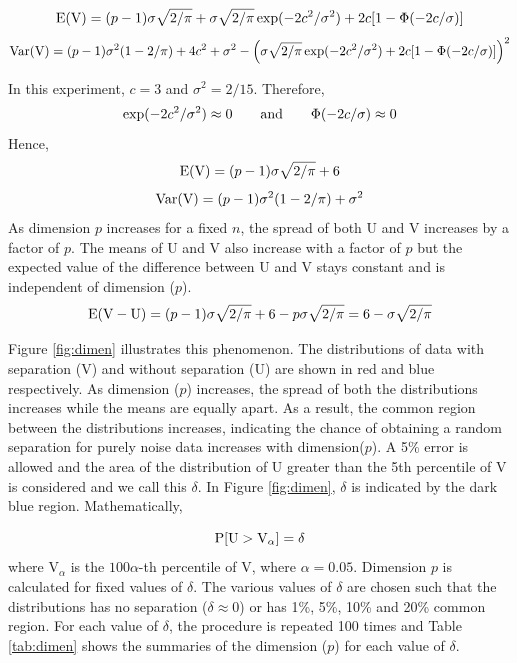 $$\hbox{E}(\mbox{V}) = (p - 1) \sigma \sqrt{2/\pi} + \sigma \sqrt{2/\pi} \exp(- 2c^2/\sigma^2) + 2c[1 - \Phi(-2c/\sigma)]$$
$$\hbox{Var}(\mbox{V}) = (p - 1)\sigma^2 (1 - 2/\pi) + 4c^2 + \sigma^2 - \left( \sigma \sqrt{2/\pi} \exp(- 2c^2/\sigma^2) + 2c[1 - \Phi(-2c/\sigma)]\right)^2$$

In this experiment, $c = 3$ and $\sigma^2 = 2/15$. Therefore,
$$\exp(- 2c^2/\sigma^2) \approx 0 \qquad \hbox{and} \qquad \Phi(-2c/\sigma) \approx 0$$
Hence,
$$\hbox{E}(\mbox{V}) = (p - 1) \sigma \sqrt{2/\pi} + 6$$
$$\hbox{Var}(\mbox{V}) = (p - 1)\sigma^2 (1 - 2/\pi) + \sigma^2$$
As dimension $p$ increases for a fixed $n$, the spread of both U and V increases by a factor of $p$. The means of U and V also increase with a factor of $p$ but the expected value of the difference between U and V stays constant and is independent of dimension ($p$). 
$$\hbox{E} (\mbox{V} - \mbox{U}) = (p - 1) \sigma \sqrt{2/\pi} + 6 - p \sigma \sqrt{2/\pi} = 6 - \sigma \sqrt{2/\pi}$$


Figure \ref{fig:dimen} illustrates this phenomenon. The distributions of data with separation (V) and without separation (U) are shown in red and blue respectively. As dimension ($p$) increases, the spread of both the distributions increases while the means are equally apart. As a result, the common region between the distributions increases, indicating the chance of obtaining a random separation for purely noise data increases with dimension($p$). A 5\% error is allowed and the area of the distribution of U greater than the 5th percentile of V is considered and we call this $\delta$. In Figure \ref{fig:dimen}, $\delta$ is indicated by the dark blue region. Mathematically, 

$$\hbox{P}[\mbox{U} > \mbox{V}_{\alpha}] = \delta$$ where $\mbox{V}_{\alpha}$ is the $100\alpha$-th percentile of V, where $\alpha = 0.05$.  Dimension $p$ is calculated for fixed values of $\delta$. The various values of $\delta$ are chosen such that the distributions has no separation ($\delta \approx 0$) or has 1\%, 5\%, 10\% and 20\% common region. For each value of $\delta$, the procedure is repeated 100 times and Table \ref{tab:dimen} shows the summaries of the dimension ($p$) for each value of $\delta$.

